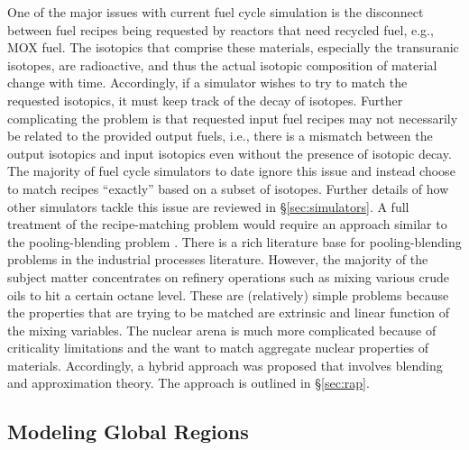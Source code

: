 One of the major issues with current fuel cycle simulation is the disconnect
between fuel recipes being requested by reactors that need recycled fuel,
e.g., MOX fuel. The isotopics that comprise these materials, especially the
transuranic isotopes, are radioactive, and thus the actual isotopic composition
of material change with time. Accordingly, if a simulator wishes to try to match
the requested isotopics, it must keep track of the decay of isotopes. Further
complicating the problem is that requested input fuel recipes may not
necessarily be related to the provided output fuels, i.e., there is a mismatch
between the output isotopics and input isotopics even without the presence of
isotopic decay. The majority of fuel cycle simulators to date ignore this issue
and instead choose to match recipes ``exactly'' based on a subset of
isotopes. Further details of how other simulators tackle this issue are reviewed
in \S\ref{sec:simulators}. A full treatment of the recipe-matching problem would
require an approach similar to the pooling-blending problem
\cite{tawarmalani_convexification_2002}. There is a rich literature base for
pooling-blending problems
\cite{glen_mixed_1988,rigby_evolution_1995,mendez_simultaneous_2006,misener_advances_2009}
in the industrial processes literature. However, the majority of the subject
matter concentrates on refinery operations such as mixing various crude oils to
hit a certain octane level. These are (relatively) simple problems because the
properties that are trying to be matched are extrinsic and linear function of
the mixing variables. The nuclear arena is much more complicated because of
criticality limitations and the want to match aggregate nuclear properties of
materials. Accordingly, a hybrid approach was proposed that involves blending and
approximation theory. The approach is outlined in \S\ref{sec:rap}.

\subsection{Modeling Global Regions}

